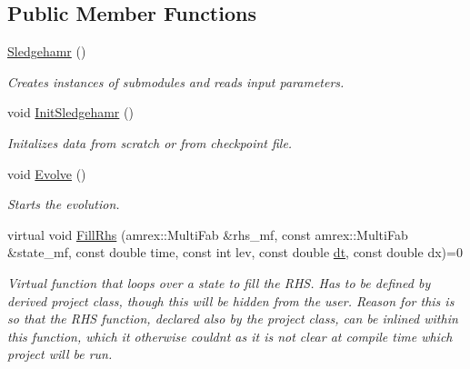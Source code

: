 \subsection*{Public Member Functions}
\begin{DoxyCompactItemize}
\item 
\mbox{\label{classsledgehamr_1_1Sledgehamr_aa79a7ecd89061020a65f5259a286bc3a}} 
\mbox{\hyperlink{classsledgehamr_1_1Sledgehamr_aa79a7ecd89061020a65f5259a286bc3a}{Sledgehamr}} ()
\begin{DoxyCompactList}\small\item\em Creates instances of submodules and reads input parameters. \end{DoxyCompactList}\item 
\mbox{\label{classsledgehamr_1_1Sledgehamr_ac68165a48b6802a8910c19c89524975d}} 
void \mbox{\hyperlink{classsledgehamr_1_1Sledgehamr_ac68165a48b6802a8910c19c89524975d}{Init\+Sledgehamr}} ()
\begin{DoxyCompactList}\small\item\em Initalizes data from scratch or from checkpoint file. \end{DoxyCompactList}\item 
\mbox{\label{classsledgehamr_1_1Sledgehamr_a356dc1022d4a792e67ee5af0bab4854c}} 
void \mbox{\hyperlink{classsledgehamr_1_1Sledgehamr_a356dc1022d4a792e67ee5af0bab4854c}{Evolve}} ()
\begin{DoxyCompactList}\small\item\em Starts the evolution. \end{DoxyCompactList}\item 
virtual void \mbox{\hyperlink{classsledgehamr_1_1Sledgehamr_acf3cdcc305af82ca3ce9efa61c9fc318}{Fill\+Rhs}} (amrex\+::\+Multi\+Fab \&rhs\+\_\+mf, const amrex\+::\+Multi\+Fab \&state\+\_\+mf, const double time, const int lev, const double \mbox{\hyperlink{classsledgehamr_1_1Sledgehamr_a9239f0c77e572cc155e33f602c19b8dc}{dt}}, const double dx)=0
\begin{DoxyCompactList}\small\item\em Virtual function that loops over a state to fill the R\+HS. Has to be defined by derived project class, though this will be hidden from the user. Reason for this is so that the R\+HS function, declared also by the project class, can be inlined within this function, which it otherwise couldn\textquotesingle{}t as it is not clear at compile time which project will be run. \end{DoxyCompactList}\item 

\end{DoxyCompactItemize}
